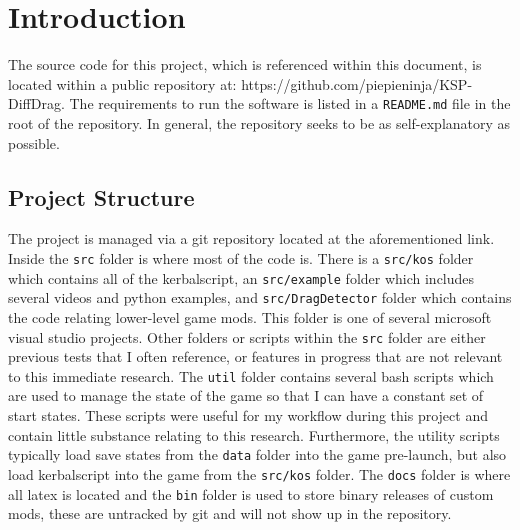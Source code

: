 \documentclass[journal,a4paper,12pt]{IEEEtran}
\begin{document}
\IEEEpeerreviewmaketitle


%
%
\section{Introduction}

The source code for this project, which is referenced within this document, is located
within a public repository
at: https://github.com/piepieninja/KSP-DiffDrag. The requirements to run the software
is listed in a \texttt{README.md} file in the root of the repository. In general,
the repository seeks to be as self-explanatory as possible.

\subsection{Project Structure}
The project is managed via a git repository located at the aforementioned link.
Inside the \texttt{src} folder is where most of the code is. There is a \texttt{src/kos}
folder which contains all of the kerbalscript, an \texttt{src/example} folder which includes
several videos and python examples, and \texttt{src/DragDetector} folder which contains
the code relating lower-level game mods. This folder is one of several microsoft
visual studio projects. Other folders or scripts within the \texttt{src}
folder are either previous tests that I often reference, or features in progress that are
not relevant to this immediate research.
The \texttt{util} folder contains several bash scripts which are used to manage the state
of the game so that I can have a constant set of start states. These scripts were useful for
my workflow during this project and contain little substance relating to this research.
Furthermore, the utility scripts typically load save states from the \texttt{data} folder
into the game pre-launch, but also load kerbalscript into the game from the \texttt{src/kos}
folder. The \texttt{docs} folder is where all latex is located and the \texttt{bin} folder
is used to store binary releases of custom mods, these are untracked by git and will not
show up in the repository.

\end{document}
